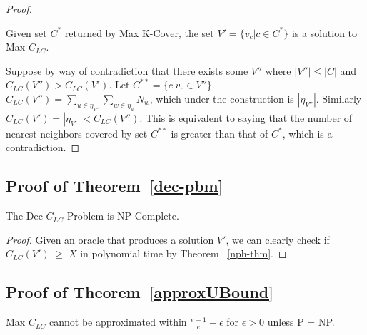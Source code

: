\begin{proof}
\begin{Claim}  Given set $C^*$ returned by Max K-Cover, the set $V' = \{ v_c | c \in C^* \}$ is a solution to Max $C_{LC}$. \end{Claim}

Suppose by way of contradiction that there exists some $V''$ where $|V''| \leq |C|$ and $C_{LC}(V'') > C_{LC}(V')$.  Let $C^{**} = \{c | v_c \in V''\}$.  \\

$C_{LC}(V'') = \sum_{u \in \eta_{V''} } \sum_{w \in \eta_u} N_w$, which under the construction is $| \eta_{V''} |$.  Similarly $C_{LC}(V') = | \eta_{V'} | < C_{LC}(V'')$.  This is equivalent to saying that the number of nearest neighbors covered by set $C^{**}$ is greater than that of $C^*$, which is a contradiction.  \end{proof}

\subsection{Proof of Theorem~\ref{dec-pbm}}
The Dec $C_{LC}$ Problem is NP-Complete. \\
\begin{proof} 

Given an oracle that produces a solution $V'$, we can clearly check if  $C_{LC}(V') \; \geq \; X$ in polynomial time by Theorem ~\ref{nph-thm}. \end{proof}

\subsection{Proof of Theorem~\ref{approxUBound}}
Max $C_{LC}$ cannot be approximated within $\frac{e - 1}e + \epsilon$ for $\epsilon > 0$ unless P = NP. \\

